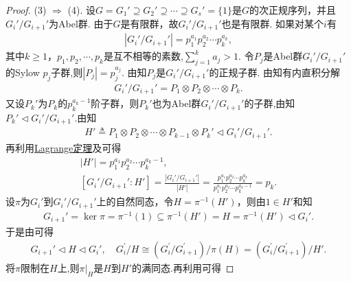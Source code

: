 \documentclass[../../main.tex]{subfiles}%
\begin{document}
\begin{proof}
(3) $\Rightarrow$ (4). 设$G = G_1' \supseteq G_2' \supseteq \cdots \supseteq G_s' = \{1\}$是$G$的次正规序列，并且$G_i'/G_{i+1}'$为Abel群. 由于$G$是有限群，故$G_i'/G_{i+1}'$也是有限群. 如果对某个$i$有
\begin{align*}
|G_i'/G_{i+1}'| = p_1^{a_1}p_2^{a_2} \cdots p_k^{a_k},
\end{align*}
其中$k \geqslant 1$，$p_1, p_2, \cdots, p_k$是互不相等的素数,$\sum\limits_{j=1}^k a_j > 1$. 令$P_j$是Abel群$G_i'/G_{i+1}'$的Sylow $p_j$子群,则$|P_j|=p_j^{a_j}$. 由知$P_j$是$G_i'/G_{i+1}'$的正规子群. 由知有内直积分解
\begin{align*}
G_i'/G_{i+1}' = P_1 \otimes P_2 \otimes \cdots \otimes P_k.
\end{align*}
又设$P_k'$为$P_k$的$p_k^{a_k - 1}$阶子群，则$P_k'$也为Abel群$G_i'/G_{i+1}'$的子群,由知$P_k'\lhd G_i'/G_{i+1}'$.由知
\begin{align*}
H' \triangleq P_1 \otimes P_2 \otimes \cdots \otimes P_{k-1} \otimes P_k'\lhd G_i'/G_{i+1}'.
\end{align*}
再利用\hyperref[theorem:抽象代数--Lagrange定理]{Lagrange定理}及可得
\begin{gather}
|H'|=p_{1}^{a_1}p_{2}^{a_2}\cdots p_{k}^{a_k-1},\nonumber
\\
[G_i' /G_{i+1}':H' ]=\frac{\left| G_i' /G_{i+1}' \right|}{\left| H' \right|}=\frac{p_{1}^{a_1}p_{2}^{a_2}\cdots p_{k}^{a_k}}{p_{1}^{a_1}p_{2}^{a_2}\cdots p_{k}^{a_k-1}}=p_k.\label{eq::fiohw3jfwiu30f9wk3}
\end{gather}
设$\pi$为$G_i'$到$G_i'/G_{i+1}'$上的自然同态，令$H = \pi^{-1}(H')$，则由$1\in H'$和知
\begin{align*}
G_{i+1}'=\ker\pi=\pi^{-1}(1) \subseteq \pi^{-1}(H')=H=\pi^{-1}(H')\lhd G_i'.
\end{align*}
于是由可得
\begin{align*}
G_{i+1}'\lhd H \lhd G_{i}',\quad G_{i}^{\prime}/H\cong \left( G_{i}^{\prime}/G_{i+1}^{\prime} \right) /\pi \left( H \right) =\left( G_{i}^{\prime}/G_{i+1}^{\prime} \right) /H' .
\end{align*}
将$\pi$限制在$H$上,则$\pi|_{H}$是$H$到$H'$的满同态.再利用可得

\end{proof}
\end{document}
